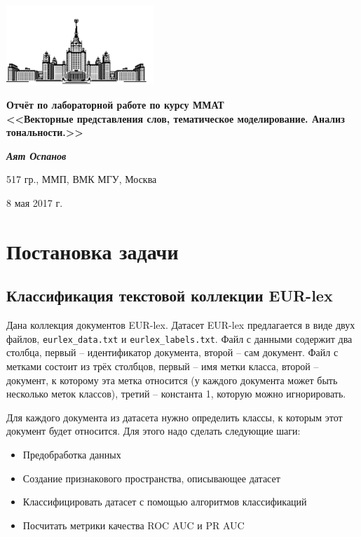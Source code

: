 \documentclass[12pt, a4paper]{article}
\begin{document}
    \begin{singlespace}
    \begin{center}
        \includegraphics[height=3cm]{msu.png}

        {\large\textbf{Отчёт по лабораторной работе по курсу ММАТ\\
        <<Векторные представления слов, тематическое моделирование. Анализ тональности.>>}}

        \vspace{0.3cm}

        \textit{\textbf{Аят Оспанов}}

        517 гр., ММП, ВМК МГУ, Москва

        8 мая 2017 г.
    \end{center}
    \end{singlespace}

    \tableofcontents

    \section{Постановка задачи}
        \subsection{Классификация текстовой коллекции EUR-lex}
            Дана коллекция документов EUR-lex. Датасет EUR-lex предлагается в виде двух файлов, \verb|eurlex_data.txt| и \verb|eurlex_labels.txt|. Файл с данными содержит два столбца, первый -- идентификатор документа, второй -- сам документ. Файл с метками состоит из трёх столбцов, первый -- имя метки класса, второй -- документ, к которому эта метка относится (у каждого документа может быть несколько меток классов), третий -- константа 1, которую можно игнорировать.

            Для каждого документа из датасета нужно определить классы, к которым этот документ будет относится. Для этого надо сделать следующие шаги:
            \begin{itemize}
                \item Предобработка данных
                \item Создание признакового пространства, описывающее датасет
                \item Классифицировать датасет с помощью алгоритмов классификаций
                \item Посчитать метрики качества ROC AUC и PR AUC
            \end{itemize}
\end{document}
